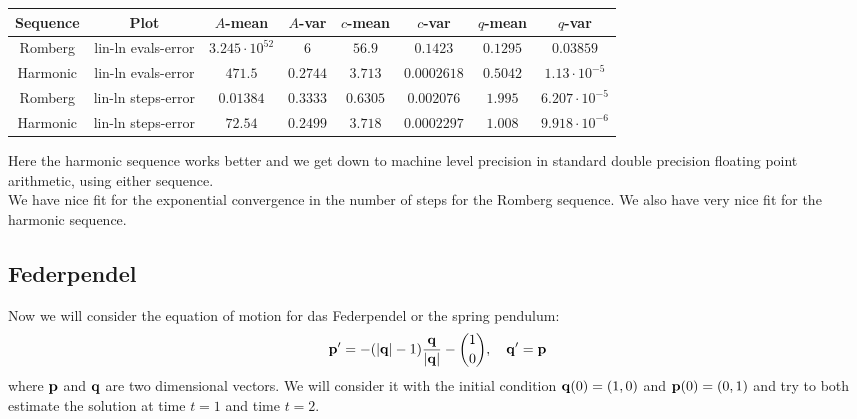 \begin{table}[H]
    \centering
    \small
     \begin{tabular}{c|c||c|c|c|c|c|c}
Sequence & Plot & \(A\)-mean & \(A\)-var & \(c\)-mean & \(c\)-var & \(q\)-mean & \(q\)-var\\\hline
Romberg & lin-ln evals-error & \(3.245\cdot 10^{52}\) & \(6\) & \(56.9\) & \(0.1423\) & \(0.1295\) & \(0.03859\) \\
Harmonic & lin-ln evals-error & \(471.5\) & \(0.2744\) & \(3.713\) & \(0.0002618\) & \(0.5042\) & \(1.13\cdot 10^{-5}\) \\
Romberg & lin-ln steps-error & \(0.01384\) & \(0.3333\) & \(0.6305\) & \(0.002076\) & \(1.995\) & \(6.207\cdot 10^{-5}\) \\
Harmonic & lin-ln steps-error & \(72.54\) & \(0.2499\) & \(3.718\) & \(0.0002297\) & \(1.008\) & \(9.918\cdot 10^{-6}\) \\
    \end{tabular}
    \label{tab:my_label}
\end{table}

Here the harmonic sequence works better and we get down to machine level precision in standard double precision floating point arithmetic, using either sequence.\\

We have nice fit for the exponential convergence in the number of steps for the Romberg sequence. We also have very nice fit for the harmonic sequence.

\subsection{Federpendel}

Now we will consider the equation of motion for das Federpendel or the spring pendulum:
\[
\mathbf{p}' = -(|\mathbf{q}| - 1)\frac{\mathbf{q}}{|\mathbf{q}|} - {1\choose 0}, \quad \mathbf{q}' = \mathbf{p}
\]
where \(\mathbf{p}\) and \(\mathbf{q}\) are two dimensional vectors. We will consider it with the initial condition \(\mathbf{q}(0) = (1,0)\) and \(\mathbf{p}(0) = (0,1)\) and try to both estimate the solution at time \(t = 1\) and time \(t = 2\).

